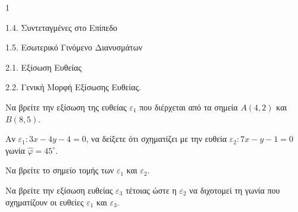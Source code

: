 \begin{ylh}{1}
    \item 1.4. Συντεταγμένες στο Επίπεδο
    \item 1.5. Εσωτερικό Γινόμενο Διανυσμάτων
    \item 2.1. Εξίσωση Ευθείας
    \item 2.2. Γενική Μορφή Εξίσωσης Ευθείας.
\end{ylh}
\begin{alist}
    \item Να βρείτε την εξίσωση της ευθείας $\varepsilon_1$ που διέρχεται από τα σημεία $A(4,2)$ και $B(8,5)$. 
    \item Αν $\varepsilon_1: 3x - 4y - 4 = 0$, να δείξετε ότι σχηματίζει με την ευθεία $\varepsilon_2: 7x - y - 1 = 0$ γωνία $\hat{\varphi} = 45^{\circ}$. 
    \item Να βρείτε το σημείο τομής των $\varepsilon_1$ και $\varepsilon_2$. 
    \item Να βρείτε την εξίσωση ευθείας $\varepsilon_3$ τέτοιας ώστε η $\varepsilon_2$ να διχοτομεί τη γωνία που σχηματίζουν οι ευθείες $\varepsilon_1$ και $\varepsilon_3$. 
\end{alist}